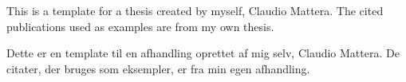 

This is a template for a \phd thesis created by myself, Claudio Mattera.
The cited publications used as examples are from my own thesis.


\begin{otherlanguage}{danish}

Dette er en template til en \phd afhandling oprettet af mig selv, Claudio Mattera.
De citater, der bruges som eksempler, er fra min egen afhandling.

\end{otherlanguage}
